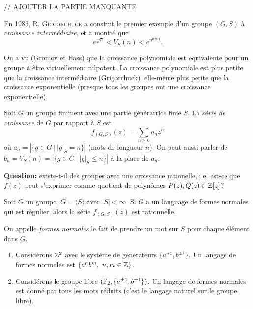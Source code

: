     // AJOUTER LA PARTIE MANQUANTE




    

    En 1983, R. \textsc{Grigorchuck} a constuit le premier exemple d'un groupe $(G, S)$ à \emph{croissance
      intermédiaire}, et a montré que
      \[e^{\sqrt{n}} < V_S(n) < e^{n^{0.991}}.\]

    On a vu (Gromov et Bass) que la croissance polynomiale est équivalente pour un groupe à être virtuellement
    nilpotent. La croissance polynomiale est plus petite que la croissance intermédiaire (Grigorchuck),
    elle-même plus petite que la croissance exponentielle (presque tous les groupes ont une croissance
    exponentielle).




    \begin{defi} 
      Soit $G$ un groupe finiment avec une partie génératrice finie $S$. La \emph{série de croissance} de $G$
      par rapport à $S$ est
        \[f_{(G,S)}(z) = \sum_{n \geq 0}a_nz^n\]
      où $a_n = \left| \{g \in G\ |\ |g|_S = n\} \right|$ (mots de longueur $n$). On peut aussi parler de $b_n
      = V_S(n) = \left| \{g \in G\ |\ |g|_S \leq n\} \right|$ à la place de $a_n$.
    \end{defi}

    
    \textbf{Question:} existe-t-il des groupes avec une croissance rationelle, i.e. est-ce que $f(z)$ peut
    s'exprimer comme quotient de polynômes $P(z), Q(z) \in \mathbb{Z}[z]$?


    \begin{theo}
      Soit $G$ un groupe, $G = \langle S \rangle$ avec $|S| < \infty$. Si $G$ a un language de formes normales
      qui est régulier, alors la série $f_{(G, S)}(z)$ est rationnelle.
    \end{theo}

    \begin{defi}
      On appelle \emph{formes normales}  le fait de prendre un mot sur $S$ pour chaque
      élément dans $G$.
    \end{defi}

    \begin{exs}
      \begin{enumerate}
      \item Considérons $\mathbb{Z}^2$ avec le système de générateurs $\{a^{\pm 1}, b^{\pm 1}\}$. Un langage de
        formes normales est $\{a^nb^m,\ n, m \in \Z\}$.

      \item Considérons le groupe libre $(\mathbb{F}_2, \{a^{\pm 1}, b^{\pm 1}\})$. Un langage de formes normales est
        donné par tous les mots réduits (c'est le langage naturel sur le groupe libre).
      \end{enumerate}
    \end{exs}


    
    

    

    
    



    

    

    


